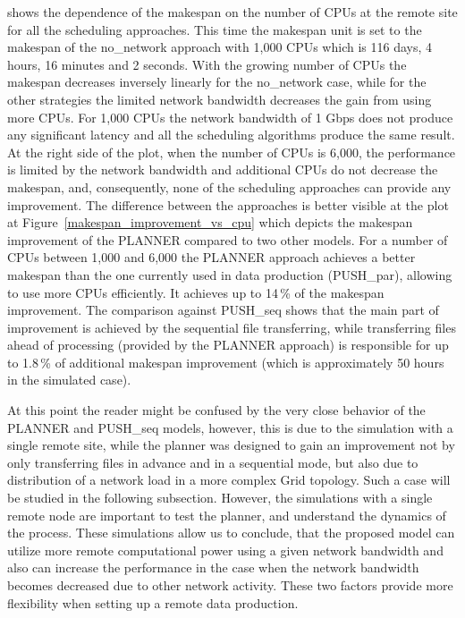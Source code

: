 \documentclass{svjour3}                     %
\begin{document}
shows the dependence of the makespan on the number of CPUs at the remote site for all the scheduling approaches. This time the makespan unit is set to  the makespan of the no\_network approach with 1,000 CPUs which is 116 days, 4 hours, 16 minutes and 2 seconds. With the growing number of CPUs the makespan decreases inversely linearly for the no\_network case, while for the other strategies the limited network bandwidth decreases the gain from using more CPUs. For 1,000 CPUs the network bandwidth of 1 Gbps does not produce any significant latency and all the scheduling algorithms produce the same result.  At the right side of the plot, when the number of CPUs is 6,000, the performance is limited by the network bandwidth and additional CPUs do not decrease the makespan, and, consequently, none of the scheduling approaches can provide any improvement.  The difference between the approaches is better visible at the plot at Figure~\ref{makespan_improvement_vs_cpu} which depicts the makespan improvement of the PLANNER compared to two other models. For a number of CPUs between 1,000 and 6,000 the PLANNER approach achieves a better makespan than the one currently used in data production (PUSH\_par), allowing to use more CPUs efficiently. It achieves up to 14\,\% of the makespan improvement. The comparison against PUSH\_seq shows that the main part of improvement is achieved by the sequential file transferring, while transferring files ahead of processing (provided by the PLANNER approach) is responsible for up to 1.8\,\% of additional makespan improvement (which is approximately 50 hours in the simulated case).

At this point the reader might be confused by the very close behavior of the PLANNER and PUSH\_seq models, however, this is due to the simulation with a single remote site, while the planner was designed to gain an improvement not by only  transferring files in advance and in a sequential mode, but also due to distribution of a network load in a more complex Grid topology. Such a case will be studied in the following subsection. However, the simulations with a single remote node are important to test the planner, and understand the dynamics of the process. These simulations allow us to conclude, that the proposed model can utilize more remote computational power using a given network bandwidth and also can increase the performance in the case when the network bandwidth becomes decreased due to other network activity. These two factors provide more flexibility when setting up a remote data production.
\end{document}
